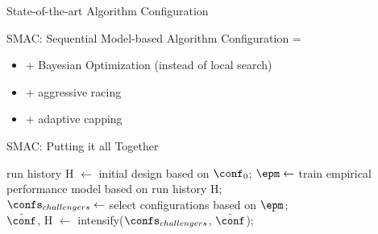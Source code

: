 \begin{frame}[c]{State-of-the-art Algorithm Configuration}

SMAC: Sequential Model-based Algorithm Configuration =

\begin{itemize}
	\item + Bayesian Optimization (instead of local search)
	\item + aggressive racing
	\item + adaptive capping
\end{itemize}

\end{frame}
\begin{frame}[c]{SMAC: Putting it all Together}

\LinesNotNumbered
\begin{algorithm}[H]
	\BlankLine
	run history H $\leftarrow$ initial design based on $\conf_0$; 
	 {
		\pause
		$\epm \leftarrow$ train empirical performance model based on run history H;\\
		\pause
		$\confs_{challengers} \leftarrow$ select configurations based on $\epm$;\\
		\pause
		$\hat{\conf}$, H $\leftarrow$ intensify($\confs_{challengers}$, $\hat{\conf}$); 
	}
	\pause
	\Return{$\hat{\conf}$}
	\caption{SMAC}
\end{algorithm}

\end{frame}

